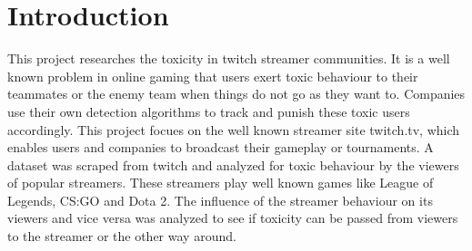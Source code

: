 \documentclass[final]{report}
\begin{document}
\chapter{Introduction}
\label{ch:introduction}

This project researches the toxicity in twitch streamer communities.
It is a well known problem in online gaming that users exert toxic behaviour to their teammates or the enemy team when things do not go as they want to.
Companies use their own detection algorithms to track and punish these toxic users accordingly.
This project focues on the well known streamer site twitch.tv, which enables users and companies to broadcast their gameplay or tournaments.
A dataset was scraped from twitch and analyzed for toxic behaviour by the viewers of popular streamers.
These streamers play well known games like League of Legends, CS:GO and Dota 2.
The influence of the streamer behaviour on its viewers and vice versa was analyzed to see if toxicity can be passed from viewers to the streamer or the other way around.
\end{document}
